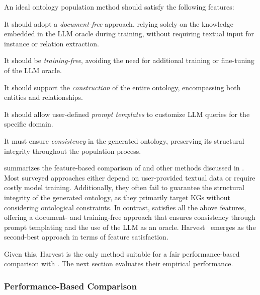 An ideal ontology population method should satisfy the following features:
%
\begin{featurelist}
    \item\label{item:f1} It should adopt a \emph{document-free} approach, relying solely on the knowledge embedded in the \gls{LLM} oracle during training, without requiring textual input for instance or relation extraction.
    \item\label{item:f2} It should be \emph{training-free}, avoiding the need for additional training or fine-tuning of the \gls{LLM} oracle.
    \item\label{item:f3} It should support the \emph{construction} of the entire ontology, encompassing both entities and relationships.
    \item\label{item:f4} It should allow user-defined \emph{prompt templates} to customize \gls{LLM} queries for the specific domain.
    \item\label{item:f5} It must ensure \emph{consistency} in the generated ontology, preserving its structural integrity throughout the population process.
\end{featurelist}
%
 summarizes the feature-based comparison of \llmfkg{} and other methods discussed in .
%
Most surveyed approaches either depend on user-provided textual data or require costly model training.
%
Additionally, they often fail to guarantee the structural integrity of the generated ontology, as they primarily target \glspl{KG} without considering ontological constraints.
%
In contrast, \llmfkg{} satisfies all the above features, offering a document- and training-free approach that ensures consistency through prompt templating and the use of the \gls{LLM} as an oracle.
%
Harvest~\cite{HaoTTNSZXH23} emerges as the second-best approach in terms of feature satisfaction.

Given this, Harvest is the only method suitable for a fair performance-based comparison with \llmfkg{}.
%
The next section evaluates their empirical performance.



\subsubsection{Performance-Based Comparison}
\label{sssec:comparison-performance}

